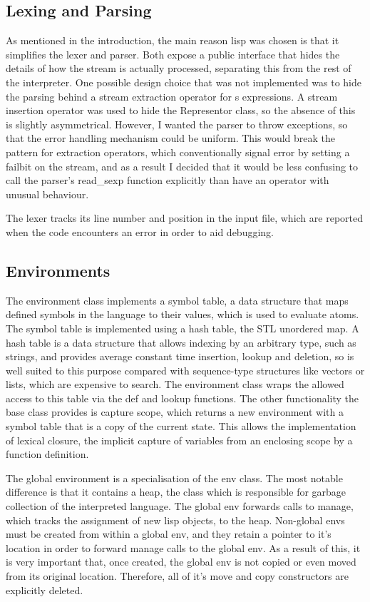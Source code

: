 \documentclass[12pt]{article}
\begin{document}
\subsection{Lexing and Parsing}
\label{section:parser}

As mentioned in the introduction, the main reason lisp was chosen is
that it simplifies the lexer and parser. Both expose a public
interface that hides the details of how the stream is actually
processed, separating this from the rest of the interpreter. One
possible design choice that was not implemented was to hide the
parsing behind a stream extraction operator for s expressions. A
stream insertion operator was used to hide the Representor class, so
the absence of this is slightly asymmetrical. However, I wanted the
parser to throw exceptions, so that the error handling mechanism could
be uniform. This would break the pattern for extraction operators,
which conventionally signal error by setting a failbit on the stream,
and as a result I decided that it would be less confusing to call the
parser's read\_sexp function explicitly than have an operator with
unusual behaviour.


The lexer tracks its line number and position in the input file,
which are reported when the code encounters an error in order to aid
debugging.


\subsection{Environments}

The environment class implements a symbol table, a data structure that
maps defined symbols in the language to their values, which is used to
evaluate atoms. The symbol table is implemented using a hash table,
the STL unordered map. A hash table is a data structure that allows
indexing by an arbitrary type, such as strings, and provides average
constant time insertion, lookup and deletion, so is well suited to
this purpose compared with sequence-type structures like vectors or
lists, which are expensive to search. The environment class wraps the
allowed access to this table via the def and lookup functions. The
other functionality the base class provides is capture scope, which
returns a new environment with a symbol table that is a copy of the
current state. This allows the implementation of lexical closure, the
implicit capture of variables from an enclosing scope by a function 
definition.


The global environment is a specialisation of the env class. The most
notable difference is that it contains a heap, the class which is
responsible for garbage collection of the interpreted language. The
global env forwards calls to manage, which tracks the assignment of
new lisp objects, to the heap. Non-global envs must be created from
within a global env, and they retain a pointer to it's location in
order to forward manage calls to the global env. As a result of
this, it is very important that, once created, the global env is not
copied or even moved from its original location. Therefore, all of
it's move and copy constructors are explicitly deleted.
\end{document}
